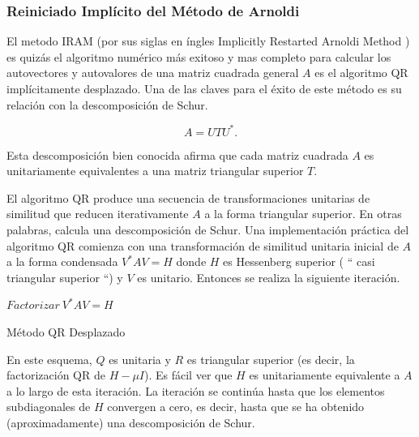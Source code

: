 \documentclass[a4paper,openright,12pt, oneside]{book}
\begin{document}
\subsubsection{Reiniciado Impl\'icito del M\'etodo de Arnoldi}

El metodo IRAM (por sus siglas en \'ingles Implicitly Restarted Arnoldi Method ) es quiz\'as el algoritmo num\'erico m\'as exitoso y mas completo para calcular los autovectores y autovalores de una matriz cuadrada general $ A $ es el algoritmo QR impl\'icitamente desplazado. Una de las claves para el \'exito de este m\'etodo es su relaci\'on con la descomposici\'on de Schur.

\begin{equation}
\label{eq:AUTU}
A = U T U^{\ast}.
\end{equation}

Esta descomposici\'on bien conocida afirma que cada matriz cuadrada $ A $ es unitariamente equivalentes a una matriz triangular superior $ T $.

El algoritmo QR produce una secuencia de transformaciones unitarias de similitud que reducen iterativamente $ A $ a la forma triangular superior. En otras palabras, calcula una descomposici\'on de Schur. Una implementaci\'on pr\'actica del algoritmo QR comienza con una transformaci\'on de similitud unitaria inicial de $ A $ a la forma condensada $ V ^ {\ast} AV = H $ donde $ H $ es Hessenberg superior ( `` casi triangular superior ``) y $ V $ es unitario. Entonces se realiza la siguiente iteraci\'on.

\begin{algorithm}
    \label{alg:SHIFTMETHOD}


    $Factorizar\ V^{\ast} AV = H$ \\


    \caption{M\'etodo QR Desplazado}
\end{algorithm}

En este esquema, $ Q $ es unitaria y $ R $ es triangular superior (es decir, la factorizaci\'on QR de $ H - \mu I $). Es f\'acil ver que $ H $ es unitariamente equivalente a $ A $ a lo largo de esta iteraci\'on. La iteraci\'on se contin\'ua hasta que los elementos subdiagonales de $ H $ convergen a cero, es decir, hasta que se ha obtenido (aproximadamente) una descomposici\'on de Schur.
\end{document}
